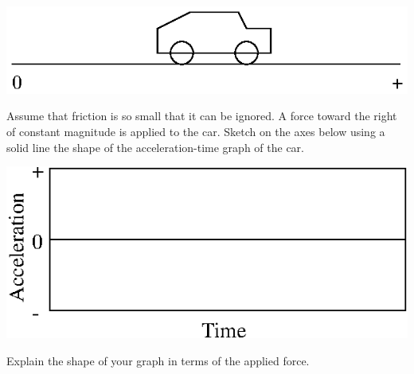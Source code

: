 \vspace{0.3cm}
{\par\centering \includegraphics{force2/force2_fig6.eps} \par}
\vspace{0.3cm}

Assume that friction is so small that it can be ignored. A force toward the
right of constant magnitude is applied to the car. Sketch on the axes below
using a solid line the shape of the acceleration-time graph of the car.

\vspace{0.3cm}
{\par\centering \includegraphics{force2/force2_fig10.eps} \par}
\vspace{0.3cm}

Explain the shape of your graph in terms of the applied force.

